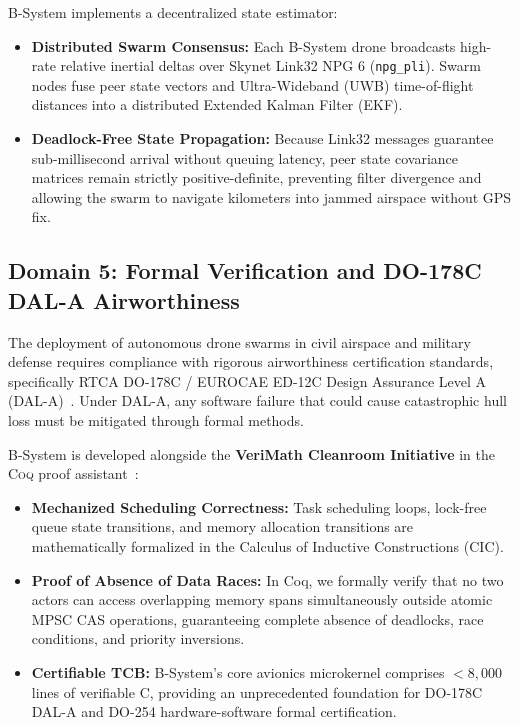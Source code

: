 \documentclass[10pt,journal,compsoc,twocolumn]{article}
\begin{document}
B-System implements a decentralized state estimator:
\begin{itemize}[leftmargin=*]
    \item \textbf{Distributed Swarm Consensus:} Each B-System drone broadcasts high-rate relative inertial deltas over Skynet Link32 NPG 6 (\texttt{npg\_pli}). Swarm nodes fuse peer state vectors and Ultra-Wideband (UWB) time-of-flight distances into a distributed Extended Kalman Filter (EKF).
    \item \textbf{Deadlock-Free State Propagation:} Because Link32 messages guarantee sub-millisecond arrival without queuing latency, peer state covariance matrices remain strictly positive-definite, preventing filter divergence and allowing the swarm to navigate kilometers into jammed airspace without GPS fix.
\end{itemize}

\subsection{Domain 5: Formal Verification and DO-178C DAL-A Airworthiness}
The deployment of autonomous drone swarms in civil airspace and military defense requires compliance with rigorous airworthiness certification standards, specifically RTCA DO-178C / EUROCAE ED-12C Design Assurance Level A (DAL-A)~\cite{do178c}. Under DAL-A, any software failure that could cause catastrophic hull loss must be mitigated through formal methods.

B-System is developed alongside the \textbf{VeriMath Cleanroom Initiative} in the \textsc{Coq} proof assistant~\cite{sokhatsky2026verimath}:
\begin{itemize}[leftmargin=*]
    \item \textbf{Mechanized Scheduling Correctness:} Task scheduling loops, lock-free queue state transitions, and memory allocation transitions are mathematically formalized in the Calculus of Inductive Constructions (\textsc{CIC}).
    \item \textbf{Proof of Absence of Data Races:} In Coq, we formally verify that no two actors can access overlapping memory spans simultaneously outside atomic MPSC CAS operations, guaranteeing complete absence of deadlocks, race conditions, and priority inversions.
    \item \textbf{Certifiable TCB:} B-System's core avionics microkernel comprises $<8{,}000$ lines of verifiable C, providing an unprecedented foundation for DO-178C DAL-A and DO-254 hardware-software formal certification.
\end{itemize}
\end{document}
